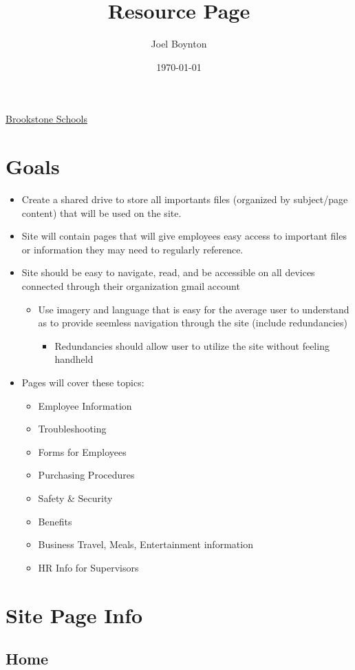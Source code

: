 \documentclass[11pt]{article}
\author{Joel Boynton}
\date{\today}
\title{Resource Page}
\begin{document}
\maketitle
\tableofcontents

\href{brookstone_schools.org}{Brookstone Schools}
\section{Goals}
\label{sec:org3d77c08}
\begin{itemize}
\item Create a shared drive to store all importants files (organized by subject/page content) that will be used on the site.
\item Site will contain pages that will give employees easy access to important files or information they may need to regularly reference.
\item Site should be easy to navigate, read, and be accessible on all devices connected through their organization gmail account
\begin{itemize}
\item Use imagery and language that is easy for the average user to understand as to provide seemless navigation through the site (include redundancies)
\begin{itemize}
\item Redundancies should allow user to utilize the site without feeling handheld
\end{itemize}
\end{itemize}
\item Pages will cover these topics:
\begin{itemize}
\item Employee Information
\item Troubleshooting
\item Forms for Employees
\item Purchasing Procedures
\item Safety \& Security
\item Benefits
\item Business Travel, Meals, Entertainment information
\item HR Info for Supervisors
\end{itemize}
\end{itemize}
\section{Site Page Info}
\label{sec:org9c17fb9}
\subsection{Home}
\label{sec:org9760881}
\end{document}
